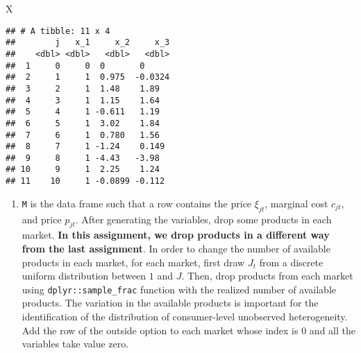 \documentclass[
]{book}
\newenvironment{Shaded}{\begin{snugshade}}{\end{snugshade}}
\newcommand{\NormalTok}[1]{#1}
\providecommand{\tightlist}{%
  \setlength{\itemsep}{0pt}\setlength{\parskip}{0pt}}
\begin{document}
\begin{Shaded}
\begin{Highlighting}[]
\NormalTok{X}
\end{Highlighting}
\end{Shaded}

\begin{verbatim}
## # A tibble: 11 x 4
##        j   x_1     x_2     x_3
##    <dbl> <dbl>   <dbl>   <dbl>
##  1     0     0  0       0     
##  2     1     1  0.975  -0.0324
##  3     2     1  1.48    1.89  
##  4     3     1  1.15    1.64  
##  5     4     1 -0.611   1.19  
##  6     5     1  3.02    1.84  
##  7     6     1  0.780   1.56  
##  8     7     1 -1.24    0.149 
##  9     8     1 -4.43   -3.98  
## 10     9     1  2.25    1.24  
## 11    10     1 -0.0899 -0.112
\end{verbatim}

\begin{enumerate}
\def\labelenumi{\arabic{enumi}.}
\setcounter{enumi}{2}
\tightlist
\item
  \texttt{M} is the data frame such that a row contains the price \(\xi_{jt}\), marginal cost \(c_{jt}\), and price \(p_{jt}\). After generating the variables, drop some products in each market. \textbf{In this assignment, we drop products in a different way from the last assignment}. In order to change the number of available products in each market, for each market, first draw \(J_t\) from a discrete uniform distribution between \(1\) and \(J\). Then, drop products from each market using \texttt{dplyr::sample\_frac} function with the realized number of available products. The variation in the available products is important for the identification of the distribution of consumer-level unobserved heterogeneity. Add the row of the outside option to each market whose index is \(0\) and all the variables take value zero.
\end{enumerate}
\end{document}
